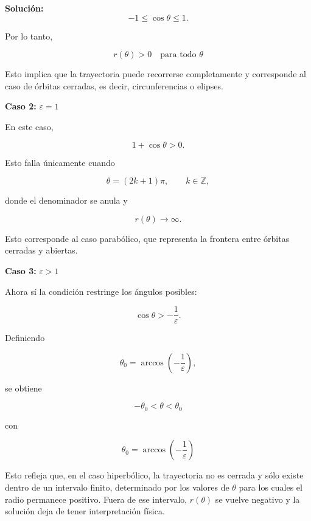 \documentclass[10pt,a4paper]{article}
\newenvironment{solution}{\par\noindent\textbf{Solución: } }{}
\begin{document}
\begin{solution}
\[
-1\leq \cos\theta \leq 1.
\]

Por lo tanto,

\[
\boxed{
r(\theta)>0
\quad
\text{para todo }
\theta
}
\]

Esto implica que la trayectoria puede recorrerse completamente y corresponde al caso de órbitas cerradas, es decir, circunferencias o elipses.

\vspace{0.3cm}

\noindent
\textbf{Caso 2:} \(\varepsilon = 1\)

\vspace{0.2cm}

En este caso,

\[
1+\cos\theta>0.
\]

Esto falla únicamente cuando

\[
\theta=(2k+1)\pi,
\qquad
k\in\mathbb{Z},
\]

donde el denominador se anula y

\[
r(\theta)\to\infty.
\]

Esto corresponde al caso parabólico, que representa la frontera entre órbitas cerradas y abiertas.

\vspace{0.3cm}

\noindent
\textbf{Caso 3:} \(\varepsilon > 1\)

\vspace{0.2cm}

Ahora sí la condición restringe los ángulos posibles:

\[
\cos\theta>-\frac{1}{\varepsilon}.
\]

Definiendo

\[
\theta_0
=
\arccos
\left(
-\frac{1}{\varepsilon}
\right),
\]

se obtiene

\[
\boxed{
-\theta_0
<
\theta
<
\theta_0
}
\]

con

\[
\boxed{
\theta_0
=
\arccos
\left(
-\frac{1}{\varepsilon}
\right)
}
\]

Esto refleja que, en el caso hiperbólico, la trayectoria no es cerrada y sólo existe dentro de un intervalo finito, determinado por los valores de \(\theta\) para los cuales el radio permanece positivo. Fuera de ese intervalo, \(r(\theta)\) se vuelve negativo y la solución deja de tener interpretación física.

\vspace{0.5cm}


\end{solution}
\end{document}
